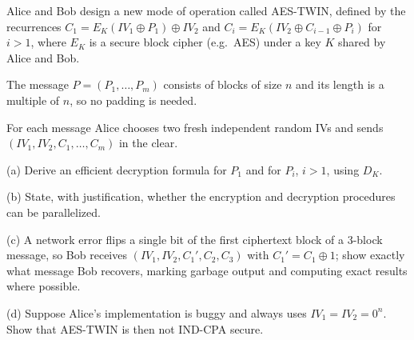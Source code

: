 \documentclass[12pt, a4paper]{article}
\begin{document}
\begin{problembox}
Alice and Bob design a new mode of operation called AES-TWIN, defined by the recurrences $C_1 = E_K(IV_1 \oplus P_1) \oplus IV_2$ and $C_i = E_K(IV_2 \oplus C_{i-1} \oplus P_i)$ for $i > 1$, where $E_K$ is a secure block cipher (e.g.\ AES) under a key $K$ shared by Alice and Bob.

The message $P = (P_1, \dots, P_m)$ consists of blocks of size $n$ and its length is a multiple of $n$, so no padding is needed.

For each message Alice chooses two fresh independent random IVs and sends $(IV_1, IV_2, C_1, \dots, C_m)$ in the clear.

(a) Derive an efficient decryption formula for $P_1$ and for $P_i$, $i > 1$, using $D_K$.

(b) State, with justification, whether the encryption and decryption procedures can be parallelized.

(c) A network error flips a single bit of the first ciphertext block of a 3-block message, so Bob receives $(IV_1, IV_2, C_1', C_2, C_3)$ with $C_1' = C_1 \oplus 1$; show exactly what message Bob recovers, marking garbage output and computing exact results where possible.

(d) Suppose Alice's implementation is buggy and always uses $IV_1 = IV_2 = 0^n$. Show that AES-TWIN is then not IND-CPA secure.
\end{problembox}
\end{document}
